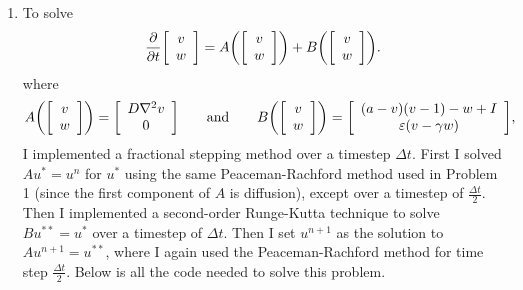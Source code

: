 \documentclass{article} %
\theoremstyle{plain}
\newcommand{\E}{\varepsilon}
\newcommand{\Dt}{\Delta t}
\numberwithin{equation}{section} %
\numberwithin{figure}{section} %
\numberwithin{table}{section} %
\begin{document}
\begin{enumerate}[\ \ (a)]
    \item
        To solve $$\frac{\partial}{\partial t}\qty[\begin{array}{c} v \\ w \end{array}] = A\qty(\qty[\begin{array}{c} v \\ w \end{array}]) + B\qty(\qty[\begin{array}{c} v \\ w \end{array}]).$$ where $$A\qty(\qty[\begin{array}{c}v \\ w \end{array}]) = \qty[\begin{array}{c}D\laplacian v \\ 0\end{array}] \qquad\text{and}\qquad B\qty(\qty[\begin{array}{c}v \\ w\end{array}]) = \qty[\begin{array}{c}\qty(a - v)(v - 1) - w + I \\ \E\qty(v - \gamma w)\end{array}],$$ I implemented a fractional stepping method over a timestep $\Dt$.  First I solved $Au^* = u^n$ for $u^*$ using the same Peaceman-Rachford method used in Problem 1 (since the first component of $A$ is diffusion), except over a timestep of $\frac{\Dt}{2}$.  Then I implemented a second-order Runge-Kutta technique to solve $Bu^{**} = u^*$ over a timestep of $\Dt$.  Then I set $u^{n+1}$ as the solution to $Au^{n+1} = u^{**}$, where I again used the Peaceman-Rachford method for time step $\frac{\Dt}{2}$.  Below is all the code needed to solve this problem. \\


\end{enumerate}
\end{document}
